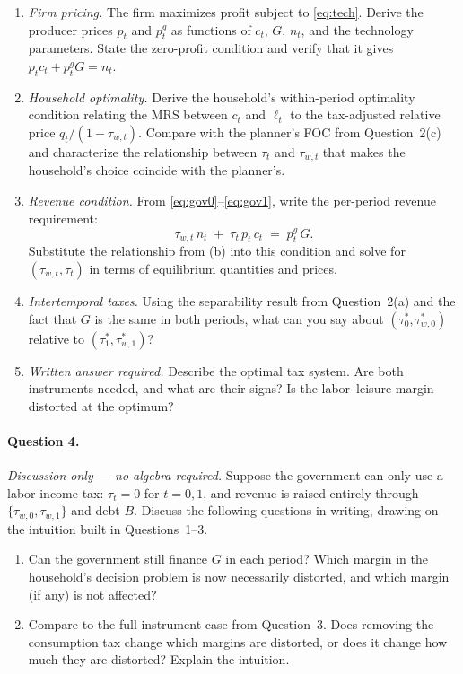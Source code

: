 \begin{enumerate}[label=(\alph*)]
    \item \emph{Firm pricing.} The firm maximizes profit subject to \eqref{eq:tech}. Derive the producer prices $p_t$ and $p_t^g$ as functions of $c_t$, $G$, $n_t$, and the technology parameters. State the zero-profit condition and verify that it gives $p_t c_t + p_t^g G = n_t$.
 
    \item \emph{Household optimality.} Derive the household's within-period optimality condition relating the MRS between $c_t$ and $\ell_t$ to the tax-adjusted relative price $q_t / (1-\tau_{w,t})$. Compare with the planner's FOC from Question~2(c) and characterize the relationship between $\tau_t$ and $\tau_{w,t}$ that makes the household's choice coincide with the planner's.
 
    \item \emph{Revenue condition.} From \eqref{eq:gov0}--\eqref{eq:gov1}, write the per-period revenue requirement:
    \[
        \tau_{w,t}\, n_t \;+\; \tau_t\, p_t\, c_t
        \;=\; p_t^g\, G.
    \]
    Substitute the relationship from (b) into this condition and solve for $(\tau_{w,t}, \tau_t)$ in terms of equilibrium quantities and prices.
 
    \item \emph{Intertemporal taxes.} Using the separability result from Question~2(a) and the fact that $G$ is the same in both periods, what can you say about $(\tau_0^*, \tau_{w,0}^*)$ relative to $(\tau_1^*, \tau_{w,1}^*)$?
 
    \item \emph{Written answer required.} Describe the optimal tax system. Are both instruments needed, and what are their signs? Is the labor--leisure margin distorted at the optimum?
\end{enumerate}
 
\paragraph{Question 4.} \emph{Discussion only --- no algebra required.}
Suppose the government can only use a labor income tax: $\tau_t = 0$ for $t = 0, 1$, and revenue is raised entirely through $\{\tau_{w,0}, \tau_{w,1}\}$ and debt $B$. Discuss the following questions in writing, drawing on the intuition built in Questions~1--3.
 
\begin{enumerate}[label=(\alph*)]
    \item Can the government still finance $G$ in each period? Which margin in the household's decision problem is now necessarily distorted, and which margin (if any) is not affected?
 
    \item Compare to the full-instrument case from Question~3. Does removing the consumption tax change which margins are distorted, or does it change how much they are distorted? Explain the intuition.
\end{enumerate}
 
